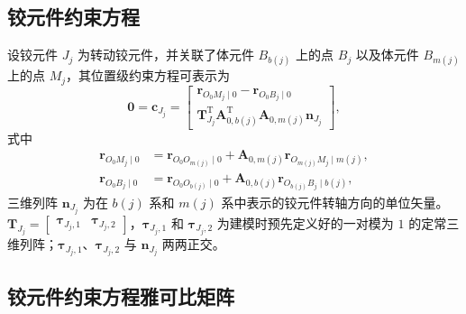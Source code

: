 \subsection{铰元件约束方程}

设铰元件 $J_j$ 为转动铰元件，并关联了体元件 $B_{b(j)}$ 上的点 $B_j$ 以及体元件 $B_{m(j)}$ 上的点 $M_j$，其位置级约束方程可表示为
\begin{equation}\label{eq:9.6}
  \boldsymbol{0} = \boldsymbol{c}_{J_j} = \begin{bmatrix}
    \boldsymbol{r}_{O_0 M_j \mid 0} - \boldsymbol{r}_{O_0 B_j \mid 0} \\[4pt]
    \boldsymbol{T}_{J_j}^{\mathrm{T}} \boldsymbol{A}_{0,b(j)}^{\mathrm{T}} \boldsymbol{A}_{0,m(j)} \boldsymbol{n}_{J_j}
  \end{bmatrix},
\end{equation}
式中
\begin{align}
  \boldsymbol{r}_{O_0 M_j \mid 0} &= \boldsymbol{r}_{O_0 O_{m(j)} \mid 0} + \boldsymbol{A}_{0,m(j)} \boldsymbol{r}_{O_{m(j)} M_j \mid m(j)}, \\
  \boldsymbol{r}_{O_0 B_j \mid 0} &= \boldsymbol{r}_{O_0 O_{b(j)} \mid 0} + \boldsymbol{A}_{0,b(j)} \boldsymbol{r}_{O_{b(j)} B_j \mid b(j)},
\end{align}
三维列阵 $\boldsymbol{n}_{J_j}$ 为在 $b(j)$ 系和 $m(j)$ 系中表示的铰元件转轴方向的单位矢量。$\boldsymbol{T}_{J_j} = \begin{bmatrix} \boldsymbol{\tau}_{J_j,1} & \boldsymbol{\tau}_{J_j,2} \end{bmatrix}$，$\boldsymbol{\tau}_{J_j,1}$ 和 $\boldsymbol{\tau}_{J_j,2}$ 为建模时预先定义好的一对模为 $1$ 的定常三维列阵；$\boldsymbol{\tau}_{J_j,1}$、$\boldsymbol{\tau}_{J_j,2}$ 与 $\boldsymbol{n}_{J_j}$ 两两正交。

\subsection{铰元件约束方程雅可比矩阵}

